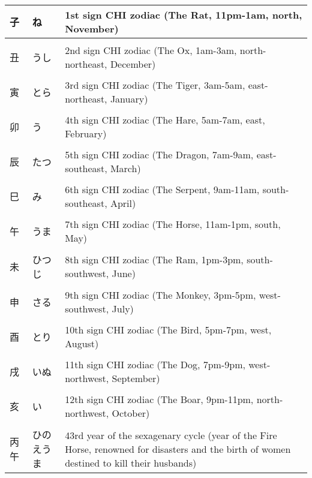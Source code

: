 \documentclass{article}
\begin{document}
\begin{tabular}{ l | l | p{10.5cm} }
子		&ね		&1st sign CHI zodiac (The Rat, 11pm-1am, north, November) \\ \hline \\[-1em]
丑		&うし		&2nd sign CHI zodiac (The Ox, 1am-3am, north-northeast, December) \\ \hline \\[-1em]
寅		&とら		&3rd sign CHI zodiac (The Tiger, 3am-5am, east-northeast, January) \\ \hline \\[-1em]
卯		&う		&4th sign CHI zodiac (The Hare, 5am-7am, east, February) \\ \hline \\[-1em]
辰		&たつ		&5th sign CHI zodiac (The Dragon, 7am-9am, east-southeast, March) \\ \hline \\[-1em]
巳		&み		&6th sign CHI zodiac (The Serpent, 9am-11am, south-southeast, April) \\ \hline \\[-1em]
午		&うま		&7th sign CHI zodiac (The Horse, 11am-1pm, south, May) \\ \hline \\[-1em]
未		&ひつじ		&8th sign CHI zodiac (The Ram, 1pm-3pm, south-southwest, June) \\ \hline \\[-1em]
申		&さる		&9th sign CHI zodiac (The Monkey, 3pm-5pm, west-southwest, July) \\ \hline \\[-1em]
酉		&とり		&10th sign CHI zodiac (The Bird, 5pm-7pm, west, August) \\ \hline \\[-1em]
戌		&いぬ		&11th sign CHI zodiac (The Dog, 7pm-9pm, west-northwest, September) \\ \hline \\[-1em]
亥		&い		&12th sign CHI zodiac (The Boar, 9pm-11pm, north-northwest, October) \\ \hline \\[-1em]
丙午		& ひのえうま	&43rd year of the sexagenary cycle (year of the Fire Horse, renowned for disasters and the birth of women destined to kill their husbands) \\[-1em] 
\end{tabular}
\end{document}
